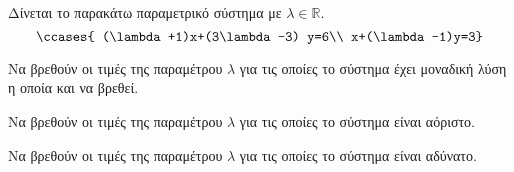 Δίνεται το παρακάτω παραμετρικό σύστημα με $ \lambda\in\mathbb{R} $.
\[ \ccases{
(\lambda+1)x+(3\lambda-3) y=6\\
x+(\lambda-1)y=3} \]
\begin{rlist}
\item Να βρεθούν οι τιμές της παραμέτρου $ \lambda $ για τις οποίες το σύστημα έχει μοναδική λύση η οποία και να βρεθεί.
\item Να βρεθούν οι τιμές της παραμέτρου $ \lambda $ για τις οποίες το σύστημα είναι αόριστο.
\item Να βρεθούν οι τιμές της παραμέτρου $ \lambda $ για τις οποίες το σύστημα είναι αδύνατο.
\end{rlist}